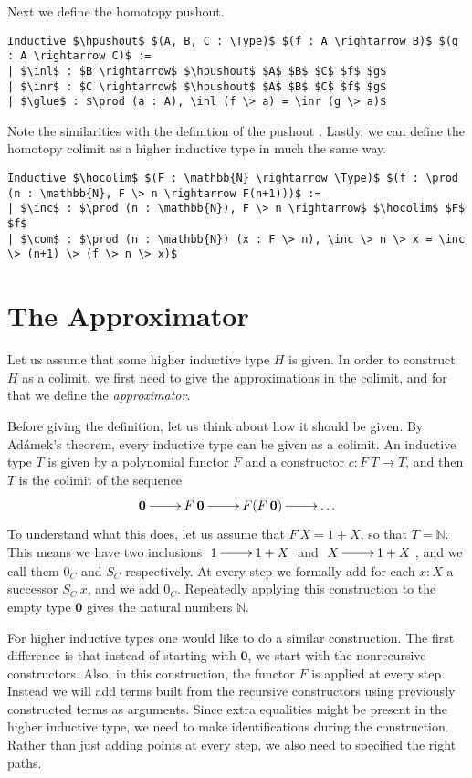 \documentclass[a4paper,UKenglish]{lipics-v2016}
\newcommand{\Boperator}[1]{\mathrm{\mathbf{#1}}}
\newcommand{\zero}[0]{\textbf{0}}
\newcommand{\hpushout}[0]{\Boperator{hpushout}}
\newcommand{\hocolim}[0]{\Boperator{hocolim}}
\newcommand{\inl}[0]{\Boperator{inl}}
\newcommand{\inr}[0]{\Boperator{inr}}
\newcommand{\glue}[0]{\Boperator{glue}}
\newcommand{\inc}[0]{\Boperator{inc}}
\newcommand{\com}[0]{\Boperator{com}}
\newcommand{\Type}[0]{\operatorname{\textsc{Type}}}
\begin{document}
Next we define the homotopy pushout.
\lstset{language=Coq}
\begin{lstlisting}
Inductive $\hpushout$ $(A, B, C : \Type)$ $(f : A \rightarrow B)$ $(g : A \rightarrow C)$ :=
| $\inl$ : $B \rightarrow$ $\hpushout$ $A$ $B$ $C$ $f$ $g$
| $\inr$ : $C \rightarrow$ $\hpushout$ $A$ $B$ $C$ $f$ $g$
| $\glue$ : $\prod (a : A), \inl (f \> a) = \inr (g \> a)$
\end{lstlisting}
Note the similarities with the definition of the pushout \cite{mac2013categories}.
Lastly, we can define the homotopy colimit as a higher inductive type in much the same way.
\lstset{language=Coq}
\begin{lstlisting}
Inductive $\hocolim$ $(F : \mathbb{N} \rightarrow \Type)$ $(f : \prod (n : \mathbb{N}, F \> n \rightarrow F(n+1)))$ :=
| $\inc$ : $\prod (n : \mathbb{N}), F \> n \rightarrow$ $\hocolim$ $F$ $f$
| $\com$ : $\prod (n : \mathbb{N}) (x : F \> n), \inc \> n \> x = \inc \> (n+1) \> (f \> n \> x)$
\end{lstlisting}

\section{The Approximator}
\label{sec:approximator}
Let us assume that some higher inductive type $H$ is given.
In order to construct $H$ as a colimit, we first need to give the approximations in the colimit, and for that we define the \emph{approximator}.

Before giving the definition, let us think about how it should be given.
By Ad\'amek's theorem, every inductive type can be given as a colimit.
An inductive type $T$ is given by a polynomial functor $F$ and a constructor $c : F \> T \rightarrow T$, and then $T$ is the colimit of the sequence
\[
\xymatrix
{
	\zero \ar[r] & F \> \zero  \ar[r] & F(F \> \zero) \ar[r] & \ldots
}
\]
To understand what this does, let us assume that $F \> X = 1 + X$, so that $T = \mathbb{N}$.
This means we have two inclusions  $\xymatrix{1 \ar[r] & 1+X}$ and  $\xymatrix{X \ar[r] & 1+X}$, and we call them $0_C$ and $S_C$ respectively.
At every step we formally add for each $x : X$ a successor $S_C \> x$, and we add $0_C$.
Repeatedly applying this construction to the empty type $\zero$ gives the natural numbers $\mathbb{N}$.

For higher inductive types one would like to do a similar construction.
The first difference is that instead of starting with $\zero$, we start with the nonrecursive constructors.
Also, in this construction, the functor $F$ is applied at every step.
Instead we will add terms built from the recursive constructors using previously constructed terms as arguments.
Since extra equalities might be present in the higher inductive type, we need to make identifications during the construction.
Rather than just adding points at every step, we also need to specified the right paths.
\end{document}
